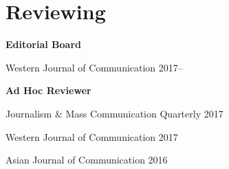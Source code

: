\section{Reviewing}

  \textbf{Editorial Board}
    \begin{innerlist}
      \item Western Journal of Communication \hfill 2017--
    \end{innerlist}\vspace{1em}

  \textbf{Ad Hoc Reviewer}
    \begin{innerlist}
      \item Journalism \& Mass Communication Quarterly \hfill 2017
      \item Western Journal of Communication \hfill 2017
      \item Asian Journal of Communication \hfill 2016
    \end{innerlist}\vspace{-.075in}
